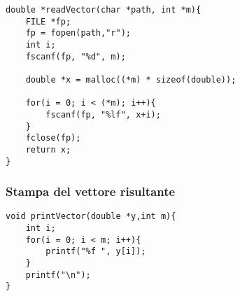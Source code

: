 \begin{lstlisting}
double *readVector(char *path, int *m){
    FILE *fp;
    fp = fopen(path,"r");
    int i;
    fscanf(fp, "%d", m);

    double *x = malloc((*m) * sizeof(double));

    for(i = 0; i < (*m); i++){
        fscanf(fp, "%lf", x+i);
    }
    fclose(fp);
    return x;
}
\end{lstlisting}

\subsubsection{Stampa del vettore risultante}
\begin{lstlisting}
void printVector(double *y,int m){
    int i;
    for(i = 0; i < m; i++){
        printf("%f ", y[i]);
    }
    printf("\n");
}
\end{lstlisting}

